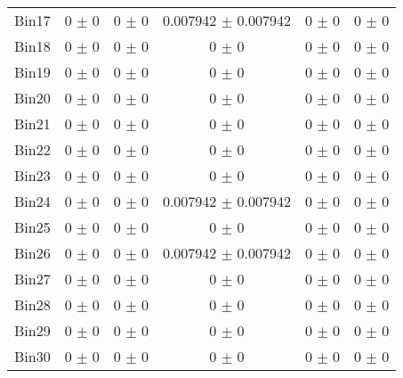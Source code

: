 \begin{tabular}{@{\extracolsep{4pt}}lccccc@{}}
     Bin17 & 0 $\pm$ 0 & 0 $\pm$ 0 & 0.007942 $\pm$ 0.007942 & 0 $\pm$ 0 & 0 $\pm$ 0 \\ 
     Bin18 & 0 $\pm$ 0 & 0 $\pm$ 0 & 0 $\pm$ 0 & 0 $\pm$ 0 & 0 $\pm$ 0 \\ 
     Bin19 & 0 $\pm$ 0 & 0 $\pm$ 0 & 0 $\pm$ 0 & 0 $\pm$ 0 & 0 $\pm$ 0 \\ 
     Bin20 & 0 $\pm$ 0 & 0 $\pm$ 0 & 0 $\pm$ 0 & 0 $\pm$ 0 & 0 $\pm$ 0 \\ 
     Bin21 & 0 $\pm$ 0 & 0 $\pm$ 0 & 0 $\pm$ 0 & 0 $\pm$ 0 & 0 $\pm$ 0 \\ 
     Bin22 & 0 $\pm$ 0 & 0 $\pm$ 0 & 0 $\pm$ 0 & 0 $\pm$ 0 & 0 $\pm$ 0 \\ 
     Bin23 & 0 $\pm$ 0 & 0 $\pm$ 0 & 0 $\pm$ 0 & 0 $\pm$ 0 & 0 $\pm$ 0 \\ 
     Bin24 & 0 $\pm$ 0 & 0 $\pm$ 0 & 0.007942 $\pm$ 0.007942 & 0 $\pm$ 0 & 0 $\pm$ 0 \\ 
     Bin25 & 0 $\pm$ 0 & 0 $\pm$ 0 & 0 $\pm$ 0 & 0 $\pm$ 0 & 0 $\pm$ 0 \\ 
     Bin26 & 0 $\pm$ 0 & 0 $\pm$ 0 & 0.007942 $\pm$ 0.007942 & 0 $\pm$ 0 & 0 $\pm$ 0 \\ 
     Bin27 & 0 $\pm$ 0 & 0 $\pm$ 0 & 0 $\pm$ 0 & 0 $\pm$ 0 & 0 $\pm$ 0 \\ 
     Bin28 & 0 $\pm$ 0 & 0 $\pm$ 0 & 0 $\pm$ 0 & 0 $\pm$ 0 & 0 $\pm$ 0 \\ 
     Bin29 & 0 $\pm$ 0 & 0 $\pm$ 0 & 0 $\pm$ 0 & 0 $\pm$ 0 & 0 $\pm$ 0 \\ 
     Bin30 & 0 $\pm$ 0 & 0 $\pm$ 0 & 0 $\pm$ 0 & 0 $\pm$ 0 & 0 $\pm$ 0 \\ 
\hline\hline
  \end{tabular}
